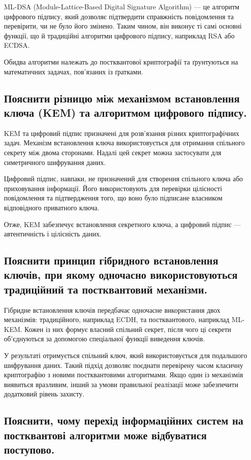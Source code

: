 ML-DSA (Module-Lattice-Based Digital Signature Algorithm) — це алгоритм цифрового підпису, який дозволяє підтвердити 
справжність повідомлення та перевірити, чи не було його змінено. Таким чином, він виконує ті самі основні функції, 
що й традиційні алгоритми цифрового підпису, наприклад RSA або ECDSA.

Обидва алгоритми належать до постквантової криптографії та ґрунтуються на математичних задачах, пов'язаних із ґратками.

\subsection{Пояснити різницю між механізмом встановлення ключа (KEM) та алгоритмом цифрового підпису.}

KEM та цифровий підпис призначені для розв'язання різних криптографічних задач. Механізм встановлення ключа використовується 
для отримання спільного секрету між двома сторонами. Надалі цей секрет можна застосувати для симетричного шифрування даних.

Цифровий підпис, навпаки, не призначений для створення спільного ключа або приховування інформації. Його використовують для 
перевірки цілісності повідомлення та підтвердження того, що воно було підписане власником відповідного приватного ключа.

Отже, KEM забезпечує встановлення секретного ключа, а цифровий підпис — автентичність і цілісність даних.

\subsection{Пояснити принцип гібридного встановлення ключів, при якому одночасно використовуються традиційний та постквантовий механізми.}

Гібридне встановлення ключів передбачає одночасне використання двох механізмів: традиційного, наприклад ECDH, та постквантового, 
наприклад ML-KEM. Кожен із них формує власний спільний секрет, після чого ці секрети об'єднуються за допомогою спеціальної функції виведення ключів.

У результаті отримується спільний ключ, який використовується для подальшого шифрування даних. Такий підхід дозволяє поєднати перевірену 
часом класичну криптографію з новими постквантовими алгоритмами. Якщо один із механізмів виявиться вразливим, інший за умови правильної 
реалізації може забезпечити додатковий рівень захисту.

\subsection{Пояснити, чому перехід інформаційних систем на постквантові алгоритми може відбуватися поступово.}

